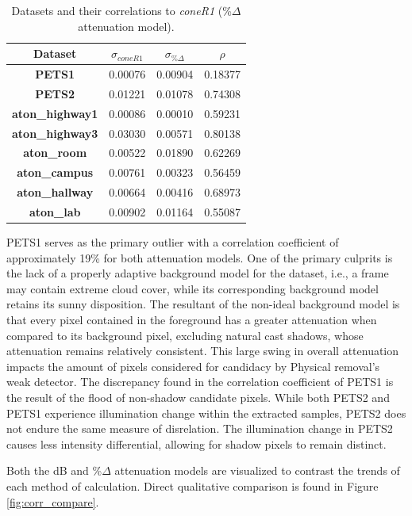 \documentclass[12pt]{report}
\begin{document}
\begin{table}
\centering
\begin{tabular}{ |c|c|c|c| }
	\hline
	\textbf{Dataset} & \textbf{$\sigma_{coneR1}$} & \textbf{$\sigma_{\%\Delta}$} & \textbf{$\rho$} \\
	\hline
	\hline
	\textbf{PETS1} & 0.00076 & 0.00904 & 0.18377 \\
	\hline
	\textbf{PETS2} & 0.01221 & 0.01078 & 0.74308 \\
	\hline
	\textbf{aton\_highway1} & 0.00086 & 0.00010 & 0.59231 \\
	\hline
	\textbf{aton\_highway3} & 0.03030 & 0.00571 &  0.80138 \\
	\hline
	\textbf{aton\_room} & 0.00522 & 0.01890 &  0.62269 \\
	\hline
	\textbf{aton\_campus} & 0.00761 & 0.00323 &  0.56459 \\
	\hline
	\textbf{aton\_hallway} & 0.00664 & 0.00416 &  0.68973 \\
	\hline
	\textbf{aton\_lab} & 0.00902 & 0.01164 &  0.55087 \\
	\hline
\end{tabular}
\caption{Datasets and their correlations to \textit{coneR1} (\%$\Delta$ attenuation model).}
\label{table:corr_rgb}
\end{table}

PETS1 serves as the primary outlier with a correlation coefficient of approximately 19\% for both attenuation models. One of the primary culprits is the lack of a properly adaptive background model for the dataset, i.e., a frame may contain extreme cloud cover, while its corresponding background model retains its sunny disposition. The resultant of the non-ideal background model is that every pixel contained in the foreground has a greater attenuation when compared to its background pixel, excluding natural cast shadows, whose attenuation remains relatively consistent. This large swing in overall attenuation impacts the amount of pixels considered for candidacy by Physical removal's weak detector. The discrepancy found in the correlation coefficient of PETS1 is the result of the flood of non-shadow candidate pixels. While both PETS2 and PETS1 experience illumination change within the extracted samples, PETS2 does not endure the same measure of disrelation. The illumination change in PETS2 causes less intensity differential, allowing for shadow pixels to remain distinct. 

Both the dB and \%$\Delta$ attenuation models are visualized to contrast the trends of each method of calculation. Direct qualitative comparison is found in Figure \ref{fig:corr_compare}. 
\end{document}
